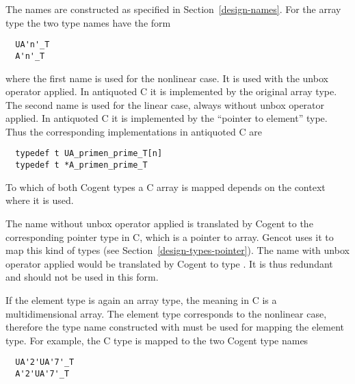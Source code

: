 The names are constructed as specified in Section~\ref{design-names}. For the array type  the two
type names have the form
\begin{verbatim}
  UA'n'_T
  A'n'_T
\end{verbatim}
where the first name is used for the nonlinear case. It is used with the unbox operator applied.
In antiquoted C it is implemented by the original array type. The second name is used for the linear
case, always without unbox operator applied. In antiquoted C it is implemented by the ``pointer to
element'' type. Thus the corresponding implementations in antiquoted C are
\begin{verbatim}
  typedef t UA_primen_prime_T[n]
  typedef t *A_primen_prime_T
\end{verbatim}

To which of both Cogent types a C array is mapped depends on the context where it is used.

The name  without unbox operator applied is translated by Cogent to the corresponding 
pointer type in C, which is a pointer to array. Gencot uses it to map this kind of types (see 
Section~\ref{design-types-pointer}).
The name  with unbox operator applied would be translated by Cogent to type .
It is thus redundant and should not be used in this form.

If the element type  is again an array type, the meaning in C is a multidimensional array. The
element type corresponds to the nonlinear case, therefore the type name constructed with 
must be used for mapping the element type. For example, the C type  is mapped to the
two Cogent type names
\begin{verbatim}
  UA'2'UA'7'_T
  A'2'UA'7'_T
\end{verbatim}

